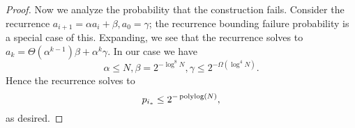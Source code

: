 \begin{proof}
  Now we analyze the probability that the construction fails. 
  Consider the recurrence $a_{i+1} = \alpha a_i + \beta, a_0 =
  \gamma$; the recurrence bounding failure probability is a
  special case of this. Expanding, we see that the recurrence
  solves to $a_k = \Theta(\alpha^{k-1})\beta + \alpha^k \gamma$.
  In our case we have 
  $$\alpha \le N, \beta = 2^{-\log^8 N}, \gamma \le 2^{-\Omega(\log^4 N)}.$$
  Hence the recurrence solves to 
  $$p_{i_*} \le 2^{-\operatorname{\text{polylog}}(N)},$$
  as desired.

\end{proof}

